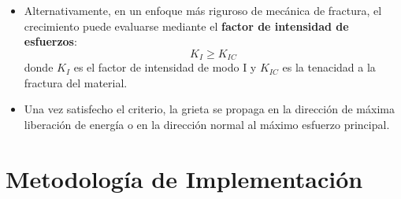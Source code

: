 \documentclass[a4paper,10pt]{exam}
\begin{document}
\begin{itemize}
o, en 2D, utilizando el tensor de esfuerzos equivalente.



\textbf{Criterio direccional de propagación:}

Una vez que se cumple la condición de falla, la grieta se extiende hacia el nodo vecino en la dirección del \textbf{máximo esfuerzo principal} o del mayor gradiente de deformación:
\[
\theta = \arg \max \left( \sigma_{\text{principal}} \right)
\]


\textbf{Actualización de la grieta:}

\begin{itemize}
\item Se identifica el nodo candidato en la dirección de propagación.
\item Se elimina la conectividad entre dicho nodo y sus vecinos en la dirección de apertura.
\item Se actualizan las condiciones de frontera internas (tracción nula).
\end{itemize}



\textbf{Nota:} Para modelos más avanzados, el criterio puede basarse en mecánica de fractura lineal elástica (LEFM), empleando el factor de intensidad de esfuerzos:
\[
K_I \geq K_{IC}
\]
lo cual proporciona una descripción más precisa del comportamiento en la punta de la grieta.

\item Alternativamente, en un enfoque más riguroso de mecánica de fractura, el crecimiento puede evaluarse mediante el \textbf{factor de intensidad de esfuerzos}:
\[
K_I \geq K_{IC}
\]
donde \(K_I\) es el factor de intensidad de modo I y \(K_{IC}\) es la tenacidad a la fractura del material.

\item Una vez satisfecho el criterio, la grieta se propaga en la dirección de máxima liberación de energía o en la dirección normal al máximo esfuerzo principal.

\end{itemize}

\section{Metodología de Implementación}
\end{document}
